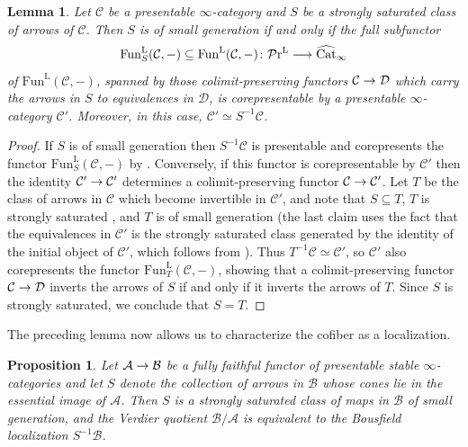 \documentclass{amsart}
\renewcommand{\to}{\mathchoice{\longrightarrow}{\rightarrow}{\rightarrow}{\rightarrow}}
\let\catsymbfont\mathcal
\newcommand{\aA}{{\catsymbfont{A}}}
\newcommand{\aB}{{\catsymbfont{B}}}
\newcommand{\aC}{{\catsymbfont{C}}}
\newcommand{\aD}{{\catsymbfont{D}}}
\renewcommand{\L}{\mathrm{L}}
\newcommand{\prcat}{{\mathcal{P}\mathrm{r}}^\mathrm{L}}
\newcommand{\Fun}{\mathrm{Fun}} %
\renewcommand{\i}{\infty}
\numberwithin{equation}{section}
\newtheorem{lemma}[equation]{Lemma}
\newtheorem{proposition}[equation]{Proposition}
\theoremstyle{definition}
\begin{document}
\begin{lemma}\label{lem:upobl}
Let $\aC$ be a presentable $\i$-category and $S$ be a strongly
saturated class of arrows of $\aC$.  Then $S$ is of small generation
if and only if the full subfunctor 
\[
\Fun^{\L}_S(\aC,-)\subseteq\Fun^{\L}(\aC,-) \colon \prcat\to\widehat{\mathrm{Cat}}_\i 
\]
of $\Fun^{\L}(\aC,-)$, spanned by those colimit-preserving functors
$\aC\to\aD$ which carry the arrows in $S$ to equivalences in $\aD$, is
corepresentable by a presentable $\i$-category $\aC'$.  Moreover, in
this case, $\aC'\simeq S^{-1}\aC$. 
\end{lemma}

\begin{proof}
If $S$ is of small generation then $S^{-1}\aC$ is presentable and
corepresents the functor $\Fun^{\L}_S(\aC,-)$
by \cite[5.5.4.14, 5.5.4.20]{HTT}.  Conversely, if
this functor is corepresentable by $\aC'$ then the identity
$\aC'\to\aC'$ determines a colimit-preserving functor $\aC\to\aC'$.
Let $T$ be the class of arrows in $\aC$ which become invertible in
$\aC'$, and note that $S\subseteq T$, $T$ is strongly
saturated \cite[5.5.4.10]{HTT}, and $T$ is of small
generation \cite[5.5.4.16]{HTT} (the last claim uses the
fact that the equivalences in $\aC'$ is the strongly saturated class
generated by the identity of the initial object of $\aC'$, which
follows from \cite[5.5.4.5, 5.5.4.6]{HTT}).  Thus
$T^{-1}\aC\simeq\aC'$, so $\aC'$ also corepresents the functor
$\Fun^{\L}_T(\aC,-)$, showing that a colimit-preserving functor
$\aC\to\aD$ inverts the arrows of $S$ if and only if it inverts the
arrows of $T$.  Since $S$ is strongly saturated, we conclude that $S=T$.
\end{proof}

The preceding lemma now allows us to characterize the cofiber as a
localization.

\begin{proposition}\label{prop:loc=cof}
Let $\aA\to\aB$ be a fully faithful functor of presentable stable
$\infty$-categories and let $S$ denote the collection of arrows in
$\aB$ whose cones lie in the essential image of $\aA$.  Then $S$ is a
strongly saturated class of maps in $\aB$ of small generation, and the
Verdier quotient $\aB/\aA$ is equivalent to the Bousfield localization
$S^{-1}\aB$. 
\end{proposition}
\end{document}
